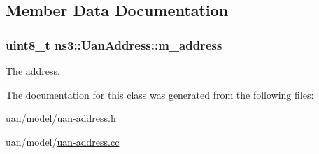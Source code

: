 \subsection{Member Data Documentation}
\subsubsection[{\texorpdfstring{m\+\_\+address}{m_address}}]{\setlength{\rightskip}{0pt plus 5cm}uint8\+\_\+t ns3\+::\+Uan\+Address\+::m\+\_\+address\hspace{0.3cm}{\ttfamily [private]}}\hypertarget{classns3_1_1UanAddress_a1c8a1aac56a876bbd5e61b25e70d6405}{}\label{classns3_1_1UanAddress_a1c8a1aac56a876bbd5e61b25e70d6405}


The address. 



The documentation for this class was generated from the following files\+:\begin{DoxyCompactItemize}
\item 
uan/model/\hyperlink{uan-address_8h}{uan-\/address.\+h}\item 
uan/model/\hyperlink{uan-address_8cc}{uan-\/address.\+cc}\end{DoxyCompactItemize}
